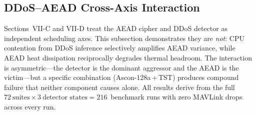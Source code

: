 
\subsection{DDoS--AEAD Cross-Axis Interaction}
\label{sec:ddos_aead}

Sections~VII-C and VII-D treat the AEAD cipher and DDoS detector as
independent scheduling axes.  This subsection demonstrates they are
\emph{not}: CPU contention from DDoS inference selectively amplifies
AEAD variance, while AEAD heat dissipation reciprocally degrades
thermal headroom.  The interaction is asymmetric---the detector is
the dominant aggressor and the AEAD is the victim---but a specific
combination (Ascon-128a\,+\,TST) produces compound failure that
neither component causes alone.  All results derive from the full
$72~\text{suites}\times 3~\text{detector states}=216$~benchmark runs
with zero MAVLink drops across every run.

